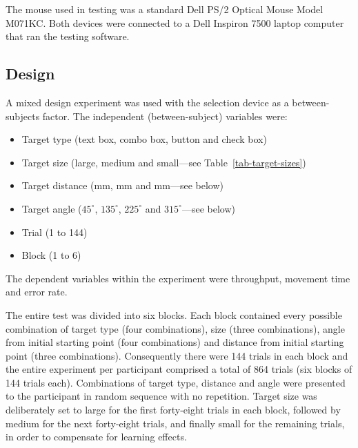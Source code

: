 \documentclass[reviewcopy]{elsart}
\begin{document}
The mouse used in testing was a standard Dell PS/2 Optical Mouse Model
M071KC. Both devices were connected to a Dell Inspiron 7500 laptop
computer that ran the testing software.


\subsection{Design}
\label{sec-method-design}

A mixed design experiment was used with the selection device as a
between-subjects factor. The independent (between-subject) variables
were:
\begin{itemize}

	\item Target type (text box, combo box, button and check box)

	\item Target size (large, medium and small---see
	Table~\ref{tab-target-sizes})

	\item Target distance (\unit[40]{mm}, \unit[80]{mm} and
	\unit[160]{mm}---see below)

	\item Target angle (\(45^{\circ}\), \(135^{\circ}\), \(225^{\circ}\)
	and \(315^{\circ}\)---see below)

	\item Trial (1 to 144)

	\item Block (1 to 6)

\end{itemize}
The dependent variables within the experiment were throughput, movement
time and error rate.

The entire test was divided into six blocks. Each block contained every
possible combination of target type (four combinations), size (three
combinations), angle from initial starting point (four combinations) and
distance from initial starting point (three combinations). Consequently
there were 144 trials in each block and the entire experiment per
participant comprised a total of 864 trials (six blocks of 144 trials
each). Combinations of target type, distance and angle were presented to
the participant in random sequence with no repetition. Target size was
deliberately set to large for the first forty-eight trials in each block,
followed by medium for the next forty-eight trials, and finally small for
the remaining trials, in order to compensate for learning effects.
\end{document}
